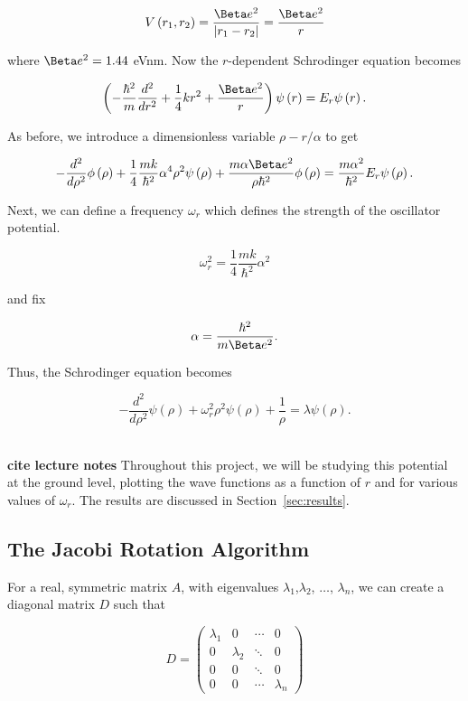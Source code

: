\documentclass[12pt]{article}
\numberwithin{equation}{section}
\begin{document}
\begin{equation}
\label{eq:coulombrep}
V\left(r_{1},r_{2}\right)=\frac{\Beta e^{2}}{|r_{1}-r_{2}|}=\frac{\Beta e^{2}}{r}
\end{equation}

\noindent where $\Beta e^{2}=1.44$ eVnm.  Now the $r$-dependent Schrodinger equation becomes

$$\left(-\frac{\hbar^{2}}{m}\frac{d^{2}}{dr^{2}}+\frac{1}{4}kr^{2}+\frac{\Beta e^{2}}{r}\right)\psi\left(r\right)=E_{r}\psi\left(r\right).$$

\noindent As before, we introduce a dimensionless variable $\rho - r/\alpha$ to get

$$-\frac{d^{2}}{d\rho^{2}}\phi\left(\rho\right)+\frac{1}{4}\frac{mk}{\hbar^{2}}\alpha^{4}\rho^{2}\psi\left(\rho\right)+\frac{m\alpha\Beta e^{2}}{\rho\hbar^{2}}\phi\left(\rho\right)=\frac{m\alpha^{2}}{\hbar^{2}}E_{r}\psi\left(\rho\right).$$

\noindent Next, we can define a frequency $\omega_{r}$ which defines the strength of the oscillator potential.

$$\omega_{r}^{2}=\frac{1}{4}\frac{mk}{\hbar^{2}}\alpha^{2}$$

\noindent and fix 

$$\alpha=\frac{\hbar^{2}}{m\Beta e^{2}}.$$

\noindent Thus, the Schrodinger equation becomes 

$$-\frac{d^{2}}{d\rho^{2}}\psi\left(\rho\right)+\omega_{r}^{2}\rho^{2}\psi\left(\rho\right)+\frac{1}{\rho}=\lambda\psi\left(\rho\right).$$

\\\indent \textbf{cite lecture notes} Throughout this project, we will be studying this potential at the ground level, plotting the wave functions as a function of $r$ and for various values of $\omega_{r}$.  The results are discussed in Section~\ref{sec:results}.

\subsection{The Jacobi Rotation Algorithm}
\label{subsec:jacobi}
For a real, symmetric matrix $A$, with eigenvalues $\lambda_{1}$,$\lambda_{2}$, $\ldots$, $\lambda_{n}$, we can create a diagonal matrix $D$ such that

$$D=\left(\begin{array}{cccc}
\lambda_{1} & 0 & \cdots & 0 \\
0 & \lambda_{2} & \ddots & 0 \\
0 & 0 & \ddots & 0 \\
0 & 0 & \cdots & \lambda_{n}
\end{array}\right)$$
\end{document}
